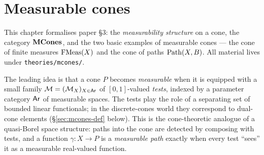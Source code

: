 %

\providecommand{\mzero}{\mathbf{0}}
\providecommand{\arzero}{\mathbf{0}}
\providecommand{\testof}[2]{\mathrm{test}_{#1}(#2)}
\providecommand{\reindex}[2]{#2 \circ #1}
\providecommand{\evtest}[1]{e_{#1}}
\providecommand{\trianglerhd}{\mathbin{\triangleright}}

\chapter{Measurable cones}\label{ch:mcones}

This chapter formalises paper \S3: the \emph{measurability structure}
on a cone, the category $\mathbf{MCones}$, and the two basic examples of
measurable cones --- the cone of finite measures $\mathrm{FMeas}(X)$ and the
cone of paths $\mathrm{Path}(X, B)$. All material lives under
\texttt{theories/mcones/}.

The leading idea is that a cone $P$ becomes \emph{measurable} when it
is equipped with a small family $\mathcal{M} = (\mathcal{M}_X)_{X \in \mathsf{Ar}}$ of
$[0,1]$-valued \emph{tests}, indexed by a parameter category $\mathsf{Ar}$ of
measurable spaces. The tests play the role of a separating set of
bounded linear functionals; in the discrete-cones world they
correspond to dual-cone elements (\S\ref{sec:mcones-def} below). This
is the cone-theoretic analogue of a quasi-Borel space structure: paths
into the cone are detected by composing with tests, and a function
$\gamma : X \to P$ is a \emph{measurable path} exactly when every test
``sees'' it as a measurable real-valued function.

